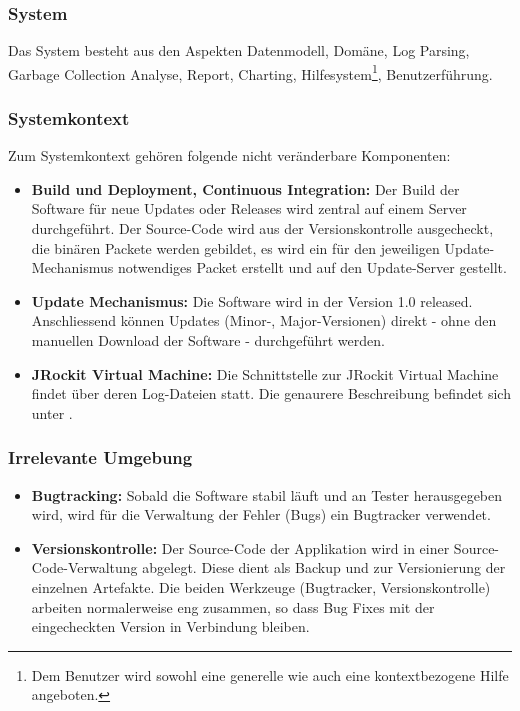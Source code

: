 \subsubsection{System}
Das System besteht aus den Aspekten Datenmodell, Domäne, Log Parsing, Garbage Collection Analyse, Report, Charting, Hilfesystem\footnote{Dem Benutzer wird sowohl eine generelle wie auch eine kontextbezogene Hilfe angeboten.}, Benutzerführung.

\subsubsection{Systemkontext}
Zum Systemkontext gehören folgende nicht veränderbare Komponenten:
\begin{itemize}
	\item \textbf{Build und Deployment, Continuous Integration:} Der Build der Software für neue Updates oder Releases wird zentral auf einem Server durchgeführt. Der Source-Code wird aus der Versionskontrolle ausgecheckt, die binären Packete werden gebildet, es wird ein für den jeweiligen Update-Mechanismus notwendiges Packet erstellt und auf den Update-Server gestellt.

	\item \textbf{Update Mechanismus:} Die Software wird in der Version 1.0 released. Anschliessend können Updates (Minor-, Major-Versionen) direkt - ohne den manuellen Download der Software - durchgeführt werden.
	\item \textbf{JRockit Virtual Machine:} Die Schnittstelle zur JRockit Virtual Machine findet über deren Log-Dateien statt. Die genaurere Beschreibung befindet sich unter .
\end{itemize}

\subsubsection{Irrelevante Umgebung}
\begin{itemize}
	\item \textbf{Bugtracking:} Sobald die Software stabil läuft und an Tester herausgegeben wird, wird für die Verwaltung der Fehler (Bugs) ein Bugtracker verwendet.
	\item \textbf{Versionskontrolle:} Der Source-Code der Applikation wird in einer Source-Code-Verwaltung abgelegt. Diese dient als Backup und zur Versionierung der einzelnen Artefakte. Die beiden Werkzeuge (Bugtracker, Versionskontrolle) arbeiten normalerweise eng zusammen, so dass Bug Fixes mit der eingecheckten Version in Verbindung bleiben.
\end{itemize}



